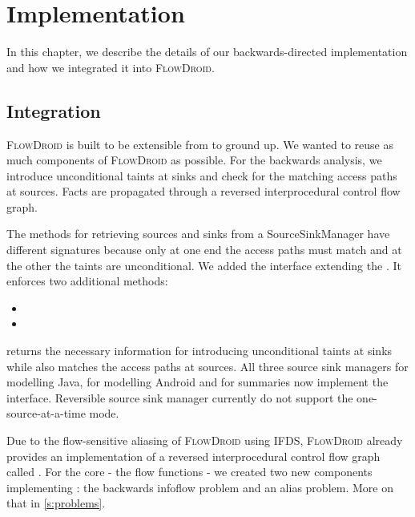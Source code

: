 \documentclass[../draft.tex]{subfiles}
\begin{document}
    \chapter{Implementation}
    In this chapter, we describe the details of our backwards-directed implementation and how we integrated it into \textsc{FlowDroid}.

    \section{Integration}
    \textsc{FlowDroid} is built to be extensible from to ground up. We wanted to reuse as much components of \textsc{FlowDroid} as possible. For the backwards analysis, we introduce unconditional taints at sinks and check for the matching access paths at sources. Facts are propagated through a reversed interprocedural control flow graph.

    The methods for retrieving sources and sinks from a SourceSinkManager have different signatures because only at one end the access paths must match and at the other the taints are unconditional. 
    We added the interface  extending the . It enforces two additional methods:
    \begin{itemize}
        \item {}
        \item {}
    \end{itemize}
     returns the necessary information for introducing unconditional taints at sinks while  also matches the access paths at sources.
    All three source sink managers  for modelling Java,  for modelling Android and  for summaries now implement the  interface.
    Reversible source sink manager currently do not support the one-source-at-a-time mode.

    Due to the flow-sensitive aliasing of \textsc{FlowDroid} using IFDS, \textsc{FlowDroid} already provides an implementation of a reversed interprocedural control flow graph called .
    For the core - the flow functions - we created two new components implementing : the backwards infoflow problem and an alias problem. More on that in \autoref{s:problems}.
\end{document}
